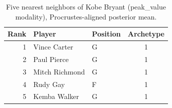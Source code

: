 \begin{table}[htbp]
  \centering\small
  \begin{tabular}{rllc}
    \toprule
    Rank & Player & Position & Archetype \\
    \midrule
    1 & Vince Carter & G & 1 \\
    2 & Paul Pierce & G & 1 \\
    3 & Mitch Richmond & G & 1 \\
    4 & Rudy Gay & F & 1 \\
    5 & Kemba Walker & G & 1 \\
    \bottomrule
  \end{tabular}
  \caption{Five nearest neighbors of Kobe Bryant (peak_value modality), Procrustes-aligned posterior mean.}
  \label{tab:Kobe_Bryant_neighbors_peak_value}
\end{table}

